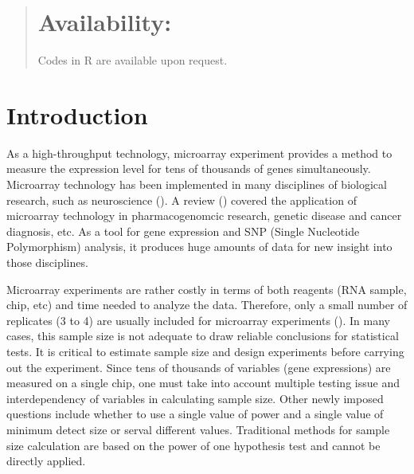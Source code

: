 \documentclass{bioinfo}
\begin{document}
\begin{abstract}
\section{Availability:}
Codes in R are available upon request.

\end{abstract}

\section{Introduction}

As a high-throughput technology, microarray experiment provides a method to measure the expression level for tens of thousands
of genes simultaneously. Microarray technology has been implemented in many disciplines of biological research, such as
neuroscience (\citealp{Mandel03}). A review (\citealp{Heller02}) covered the application of microarray technology in
pharmacogenomcic research, genetic disease and cancer diagnosis, etc. As a tool for gene expression and SNP (Single Nucleotide
Polymorphism) analysis, it produces huge amounts of data for new insight into those disciplines.

Microarray experiments are rather costly in terms of both reagents
(RNA sample, chip, etc) and time needed to analyze the data.
Therefore, only a small number of replicates (3 to 4) are usually
included for microarray experiments (\citealp{Mandel03}). In many
cases, this sample size is not adequate to draw reliable
conclusions for statistical tests. It is critical to estimate
sample size and design experiments before carrying out the
experiment. Since tens of thousands of variables (gene
expressions) are measured on a single chip, one must take into
account multiple testing issue and interdependency of variables in
calculating sample size. Other newly imposed questions include
whether to use a single value of power and a single value of
minimum detect size or serval different values. Traditional
methods for sample size calculation are based on the power of one
hypothesis test and cannot be directly applied.
\end{document}

